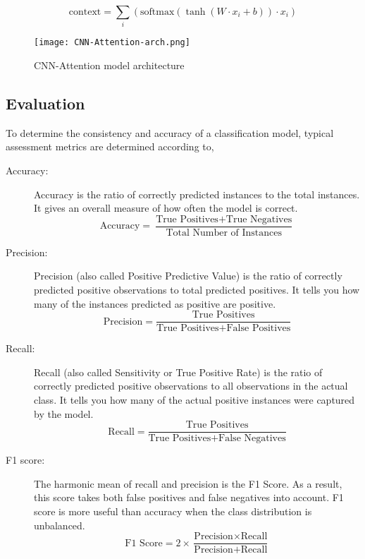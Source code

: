     \[
        \text{context} = \sum_i (\text{softmax}(\tanh(W \cdot x_i + b)) \cdot x_i)
    \]

    \begin{figure}[h]
        \centering
        \texttt{[image: CNN-Attention-arch.png]}
        \caption{CNN-Attention model architecture}
        \label{fig:cnn-attention-model-arch}
    \end{figure}

\clearpage
\subsection{Evaluation}

To determine the consistency and accuracy of a classification model, typical assessment metrics are determined according to,

\begin{description}
    \item[Accuracy:] Accuracy is the ratio of correctly predicted instances to the total instances. It gives an overall measure of how often the model is correct.
    $$\text{Accuracy} = \frac{\text{True Positives} + \text{True Negatives}}{\text{Total Number of Instances}}$$

    \item[Precision:] Precision (also called Positive Predictive Value) is the ratio of correctly predicted positive observations to total predicted positives. It tells you how many of the instances predicted as positive are positive.
    $$ \text{Precision} = \frac{\text{True Positives}}{\text{True Positives} + \text{False Positives}} $$
    
    \item[Recall:]  Recall (also called Sensitivity or True Positive Rate) is the ratio of correctly predicted positive observations to all observations in the actual class. It tells you how many of the actual positive instances were captured by the model.
    $$ \text{Recall} = \frac{\text{True Positives}}{\text{True Positives} + \text{False Negatives}} $$

    \item[F1 score:] The harmonic mean of recall and precision is the F1 Score. As a result, this score takes both false positives and false negatives into account. F1 score is more useful than accuracy when the class distribution is unbalanced.
    $$ \text{F1 Score} = 2 \times \frac{\text{Precision} \times \text{Recall}}{\text{Precision} + \text{Recall}} $$
\end{description}
\clearpage

